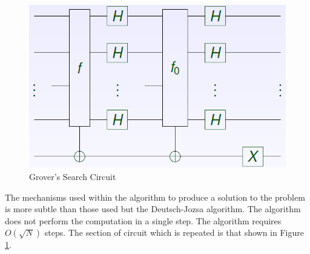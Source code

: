\documentclass[authoryearcitations]{UoYCSproject}
\begin{document}
\begin{figure}
\centering
\includegraphics[scale=0.5]{Grovers-Search}
\caption{Grover's Search Circuit}
\label{Grovers-Search-Cir}
\end{figure}


The mechanisms used within the algorithm to produce a solution to the problem is more subtle than those used but the Deutsch-Jozsa algorithm.
The algorithm does not perform the computation in a single step.
The algorithm requires $O(\sqrt{N})$ steps.
The section of circuit which is repeated is that shown in Figure \ref{Grovers-Search-Cir}.
\end{document}
